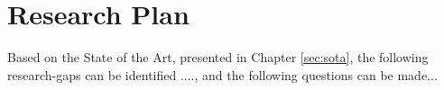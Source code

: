 \chapter{Research Plan}

Based on the State of the Art, presented in Chapter \ref{sec:sota}, the following research-gaps can be identified ...., and the following questions can be made...